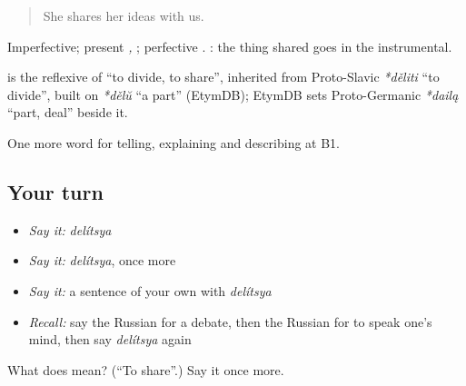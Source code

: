 \begin{quote}
She shares her ideas with us.
\end{quote}

Imperfective; present \emph{, }; perfective \emph{}. \emph{   }: the thing shared goes in the instrumental.

\begin{cousinweb}
\textbf{} is the reflexive of \emph{} \textquotedblleft{}to divide, to share\textquotedblright{}, inherited from Proto-Slavic \emph{*děliti} \textquotedblleft{}to divide\textquotedblright{}, built on \emph{*dělŭ} \textquotedblleft{}a part\textquotedblright{} (EtymDB); EtymDB sets Proto-Germanic \emph{*dailą} \textquotedblleft{}part, deal\textquotedblright{} beside it.
\end{cousinweb}

\begin{grammarlens}[title={What you've built}]
One more word for telling, explaining and describing at B1.
\end{grammarlens}

\subsection*{Your turn}
\begin{itemize}
\raggedright
  \item \emph{Say it:} \emph{delítsya}
  \item \emph{Say it:} \emph{delítsya}, once more
  \item \emph{Say it:} a sentence of your own with \emph{delítsya}
  \item \emph{Recall:} say the Russian for a debate, then the Russian for to speak one’s mind, then say \emph{delítsya} again
\end{itemize}

\begin{tcolorbox}[breakable,colback=teal!4,colframe=teal!35!black,title={Before you move on}]
What does  mean? (\textquotedblleft{}To share\textquotedblright{}.) Say it once more.
\end{tcolorbox}

